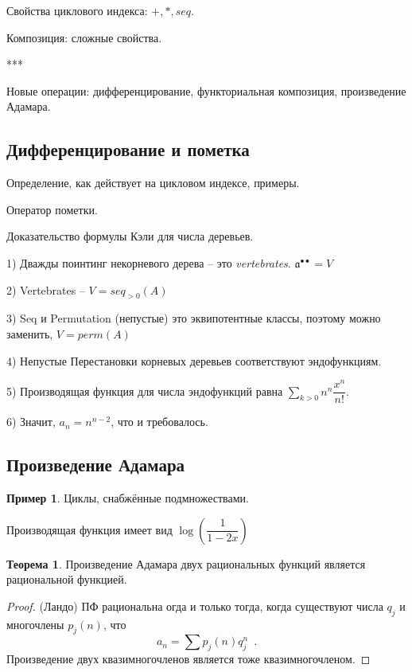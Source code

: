 \documentclass{article}
\theoremstyle{definition}
\newtheorem{example}{Пример}
\newtheorem*{theorem}{Теорема}
\begin{document}
Свойства циклового индекса: \( +, *, seq \).

Композиция: сложные свойства.

***

Новые операции: дифференцирование, функториальная композиция, произведение 
Адамара.

\subsection{Дифференцирование и пометка}

Определение, как действует на цикловом индексе, примеры.

Оператор пометки.

Доказательство формулы Кэли для числа деревьев.

1) Дважды поинтинг некорневого дерева -- это \textit{vertebrates}. \( 
\mathfrak a^{\bullet \bullet} = V \)

2) Vertebrates -- \( V = seq_{> 0}(A) \)

3) Seq и Permutation (непустые) это эквипотентные классы, поэтому можно 
заменить, \( V = 
perm(A) \)

4) Непустые Перестановки корневых деревьев соответствуют эндофункциям.

5) Производящая функция для числа эндофункций равна \( \sum_{k > 0} n^n 
\dfrac{x^n}{n!} \).

6) Значит, \( a_n = n^{n-2} \), что и требовалось.

\subsection{Произведение Адамара}

\begin{example}
	Циклы, снабжённые подмножествами. 
	
	Производящая функция имеет вид \( \log \left( \dfrac{1}{1 - 2x} \right) \)
\end{example}

\begin{theorem}
	Произведение Адамара двух рациональных функций является рациональной 
	функцией.
\end{theorem}

\begin{proof} (Ландо)
	ПФ рациональна огда и только тогда, когда существуют числа \( q_j \) и 
	многочлены \( p_j(n) \), что
	\[
		a_n = \sum p_j(n)q_j^n \enspace .
	\]
	Произведение двух квазимногочленов является тоже квазимногочленом.
\end{proof}
\end{document}
